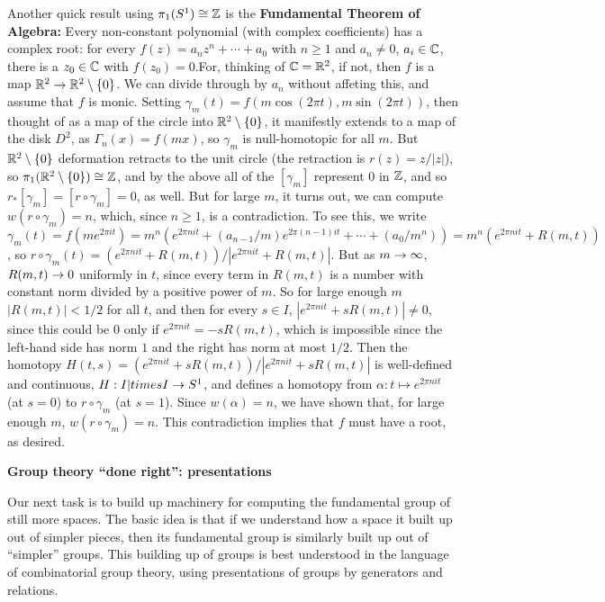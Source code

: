 \msk

Another quick result using $\pi_1(S^1)\cong {\Bbb Z}$ is the {\bf Fundamental Theorem
of Algebra:} Every non-constant polynomial (with complex coefficients)
has a complex root: for every $f(z)=a_nz^n+\cdots +a_0$ with $n\geq 1$ and $a_n\neq 0$,
$a_i\in{\Bbb C}$, there is a $z_0\in{\Bbb C}$ with $f(z_0)=0$.For, thinking
of ${\Bbb C}={\Bbb R}^2$, if not, then $f$ is a map ${\Bbb R}^2\rightarrow {\Bbb R}^2\setminus\{0\}$.
We can divide through by $a_n$ without affeting this, and assume that $f$ is monic.
Setting $\gamma_m(t)=f(m\cos(2\pi t),m\sin(2\pi t))$, then thought of as a map 
of the circle into ${\Bbb R}^2\setminus\{0\}$, it manifestly extends to a map of the 
disk $D^2$, as $\Gamma_n(x)=f(mx)$, so $\gamma_m$ is null-homotopic for all $m$. But
${\Bbb R}^2\setminus\{0\}$ deformation retracts to the unit circle (the retraction
is $r(z)=z/|z|$), so 
$\pi_1({\Bbb R}^2\setminus\{0\})\cong {\Bbb Z}$, and by the above all of the $[\gamma_m]$
represent $0$ in ${\Bbb Z}$, and so $r_*[\gamma_m]=[r\circ\gamma_m]=0$, as well. 
But for large $m$, it turns out, we can compute
$w(r\circ\gamma_m)=n$, which, since $n\geq 1$, is a contradiction. To see this,
we write $\gamma_m(t)=f(me^{2\pi it})=
m^n(e^{2\pi nit}+(a_{n-1}/m)e^{2\pi (n-1)it}+\cdots +(a_0/m^n)) = m^n(e^{2\pi nit}+R(m,t))$,
so $r\circ\gamma_m(t)=(e^{2\pi nit}+R(m,t))/|e^{2\pi nit}+R(m,t)|$.
But as $m\rightarrow \infty$, $R(m,t)\rightarrow 0$ uniformly in $t$, since every term in 
$R(m,t)$ is a number with constant norm divided by a positive power of $m$. So for 
large enough $m$ $|R(m,t)|<1/2$ for all $t$, and then 
for every $s\in I$, $|e^{2\pi nit}+sR(m,t)|\neq 0$, since this could be $0$
only if $e^{2\pi nit}=-sR(m,t)$, which is impossible since the left-hand side has
norm $1$ and the right has norm at most $1/2$. Then the homotopy
$H(t,s)=(e^{2\pi nit}+sR(m,t))/|e^{2\pi nit}+sR(m,t)|$ is well-defined and
continuous, $H:I|times I\rightarrow S^1$, and defines a homotopy from 
$\alpha:t\mapsto e^{2\pi nit}$ (at $s=0$) to $r\circ\gamma_m$ (at $s=1$).
Since $w(\alpha)=n$, we have shown that, for large enough $m$,
$w(r\circ\gamma_m)=n$. This contradiction implies that $f$ must have a root, as
desired.

\msk


{\bf Group theory ``done right'': presentations}

\msk

Our next task is to build up machinery for computing the fundamental group of 
still more spaces. The basic idea is that if we understand how a space it built
up out of simpler pieces, then its fundamental group is similarly built up out
of ``simpler'' groups. This building up of groups is best understood in the
language of combinatorial group theory, using presentations of groups by
generators and relations. 

